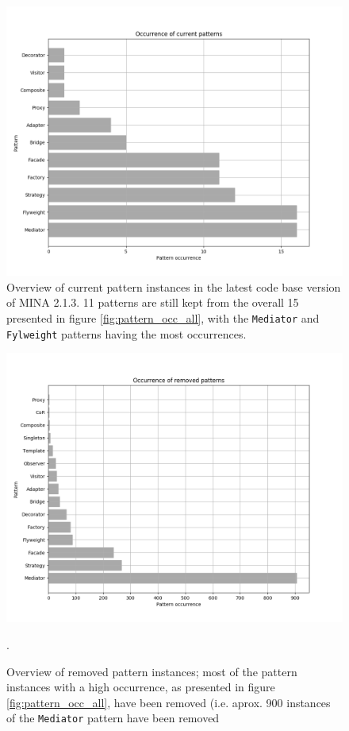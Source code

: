 \begin{figure}[H]
    \centering
    \includegraphics[width = \textwidth]{images/graphs/pattern_occurrence_current.png}
    \caption{Overview of current pattern instances in the latest code base version of MINA 2.1.3. 11 patterns are still kept from the overall 15 presented in figure \ref{fig:pattern_occ_all}, with the \texttt{Mediator} and \texttt{Fylweight} patterns having the most occurrences.}
\label{fig:pattern_occ_current}
\end{figure}

\begin{figure}
    \includegraphics[width = \textwidth]{images/graphs/pattern_occurrence_removed.png}
    \caption{Overview of removed pattern instances; most of the pattern instances with a high occurrence, as presented in figure \ref{fig:pattern_occ_all}, have been removed (i.e. aprox. 900 instances of the \texttt{Mediator} pattern have been removed}.
 
  \label{fig:pattern_occ_removed}  
    
\end{figure}

